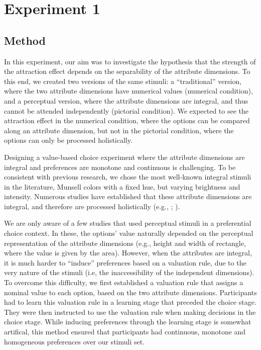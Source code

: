 \documentclass[11pt,a4paper]{article}
\begin{document}
\section{Experiment 1} 


\subsection{Method}

In this experiment, our aim was to investigate the hypothesis that the strength of the attraction effect depends on the separability of the attribute dimensions. To this end, we created two versions of the same stimuli: a ``traditional'' version, where the two attribute dimensions have numerical values (numerical condition), and a perceptual version, where the attribute dimensions are integral, and thus cannot be attended independently (pictorial condition). We expected to see the attraction effect in the numerical condition, where the options can be compared along an attribute dimension, but not in the pictorial condition, where the options can only be processed holistically.

Designing a value-based choice experiment where the attribute dimensions are integral and preferences are monotone and continuous is challenging. To be consistent with previous research, we chose the most well-known integral stimuli in the literature, Munsell colors with a fixed hue, but varying brightness and intensity. Numerous studies have established that these attribute dimensions are integral, and therefore are processed holistically (e.g., ; ). 

We are only aware of a few studies that used perceptual stimuli in a preferential choice context. In these, the options' value naturally depended on the perceptual representation of the attribute dimensions (e.g., height and width of rectangle, where the value is given by the area). However, when the attributes are integral, it is much harder to ``induce'' preferences based on a valuation rule, due to the very nature of the stimuli (i.e, the inaccessibility of the independent dimensions). To overcome this difficulty, we first established a valuation rule that assigns a nominal value to each option, based on the two attribute dimensions. Participants had to learn this valuation rule in a learning stage that preceded the choice stage. They were then instructed to use the valuation rule when making decisions in the choice stage. While inducing preferences through the learning stage is somewhat artifical, this method ensured that participants had continuous, monotone and homogeneous preferences over our stimuli set. 
\end{document}
